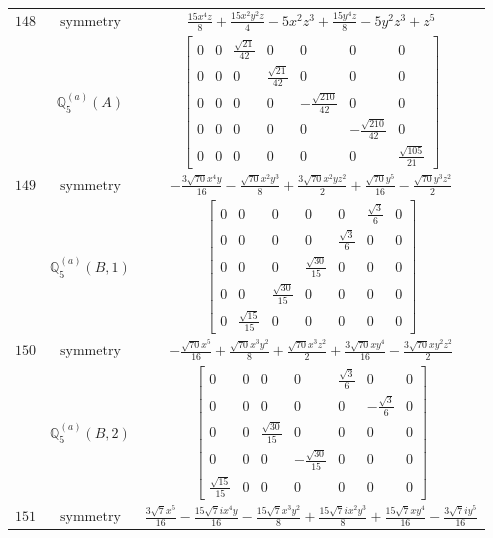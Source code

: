 \documentclass[fleqn,8pt,landscape]{jsarticle}
\begin{document}
\begin{longtable}{ccc}
$ 148 $ & $ \text{symmetry} $ & $ \frac{15 x^{4} z}{8} + \frac{15 x^{2} y^{2} z}{4} - 5 x^{2} z^{3} + \frac{15 y^{4} z}{8} - 5 y^{2} z^{3} + z^{5} $ \\
$  $ & $ \mathbb{Q}_{5}^{(a)}(A) $ & $ \begin{bmatrix} 0 & 0 & \frac{\sqrt{21}}{42} & 0 & 0 & 0 & 0 \\ 0 & 0 & 0 & \frac{\sqrt{21}}{42} & 0 & 0 & 0 \\ 0 & 0 & 0 & 0 & - \frac{\sqrt{210}}{42} & 0 & 0 \\ 0 & 0 & 0 & 0 & 0 & - \frac{\sqrt{210}}{42} & 0 \\ 0 & 0 & 0 & 0 & 0 & 0 & \frac{\sqrt{105}}{21} \end{bmatrix} $ \\ \hline
$ 149 $ & $ \text{symmetry} $ & $ - \frac{3 \sqrt{70} x^{4} y}{16} - \frac{\sqrt{70} x^{2} y^{3}}{8} + \frac{3 \sqrt{70} x^{2} y z^{2}}{2} + \frac{\sqrt{70} y^{5}}{16} - \frac{\sqrt{70} y^{3} z^{2}}{2} $ \\
$  $ & $ \mathbb{Q}_{5}^{(a)}(B,1) $ & $ \begin{bmatrix} 0 & 0 & 0 & 0 & 0 & \frac{\sqrt{3}}{6} & 0 \\ 0 & 0 & 0 & 0 & \frac{\sqrt{3}}{6} & 0 & 0 \\ 0 & 0 & 0 & \frac{\sqrt{30}}{15} & 0 & 0 & 0 \\ 0 & 0 & \frac{\sqrt{30}}{15} & 0 & 0 & 0 & 0 \\ 0 & \frac{\sqrt{15}}{15} & 0 & 0 & 0 & 0 & 0 \end{bmatrix} $ \\ \hline
$ 150 $ & $ \text{symmetry} $ & $ - \frac{\sqrt{70} x^{5}}{16} + \frac{\sqrt{70} x^{3} y^{2}}{8} + \frac{\sqrt{70} x^{3} z^{2}}{2} + \frac{3 \sqrt{70} x y^{4}}{16} - \frac{3 \sqrt{70} x y^{2} z^{2}}{2} $ \\
$  $ & $ \mathbb{Q}_{5}^{(a)}(B,2) $ & $ \begin{bmatrix} 0 & 0 & 0 & 0 & \frac{\sqrt{3}}{6} & 0 & 0 \\ 0 & 0 & 0 & 0 & 0 & - \frac{\sqrt{3}}{6} & 0 \\ 0 & 0 & \frac{\sqrt{30}}{15} & 0 & 0 & 0 & 0 \\ 0 & 0 & 0 & - \frac{\sqrt{30}}{15} & 0 & 0 & 0 \\ \frac{\sqrt{15}}{15} & 0 & 0 & 0 & 0 & 0 & 0 \end{bmatrix} $ \\ \hline
$ 151 $ & $ \text{symmetry} $ & $ \frac{3 \sqrt{7} x^{5}}{16} - \frac{15 \sqrt{7} i x^{4} y}{16} - \frac{15 \sqrt{7} x^{3} y^{2}}{8} + \frac{15 \sqrt{7} i x^{2} y^{3}}{8} + \frac{15 \sqrt{7} x y^{4}}{16} - \frac{3 \sqrt{7} i y^{5}}{16} $ \\

\end{longtable}
\end{document}
